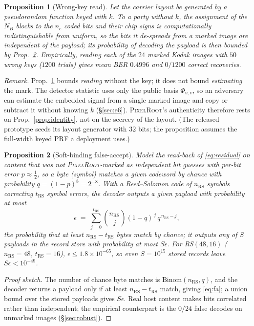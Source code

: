 \documentclass[journal]{IEEEtran}
\newcommand{\pr}{\textup{\textsc{PixelRoot}}}
\newtheorem{proposition}{Proposition}
\begin{document}
\begin{proposition}[Wrong-key read]\label{prop:carriers}
Let the carrier layout be generated by a pseudorandom function keyed with $k$.
To a party without $k$, the assignment of the $N_B$ blocks to the $n_c$ coded
bits and their chip signs is computationally indistinguishable from uniform, so
the bits it de-spreads from a marked image are independent of the payload; its
probability of decoding the payload is then bounded by Prop.~\ref{prop:v2}.
Empirically, reading each of the $24$ marked Kodak images with $50$ wrong keys
($1200$ trials) gives mean BER $0.4996$ and $0/1200$ correct recoveries.
\end{proposition}

\noindent\emph{Remark.} Prop.~\ref{prop:carriers} bounds \emph{reading} without
the key; it does not bound \emph{estimating} the mark. The detector statistic
uses only the public basis $\Phi_{u,v}$, so an adversary can estimate the
embedded signal from a single marked image and copy or subtract it without
knowing $k$ (\S\ref{sec:e6}). \pr{}'s authenticity therefore rests on
Prop.~\ref{prop:identity}, not on the secrecy of the layout. (The released
prototype seeds its layout generator with $32$ bits; the proposition assumes the
full-width keyed PRF a deployment uses.)

\begin{proposition}[Soft-binding false-accept]\label{prop:v2}
Model the read-back of \eqref{eq:residual} on content that was \emph{not}
\pr{}-marked as independent bit guesses with per-bit error $p\!\approx\!\tfrac12$,
so a byte (symbol) matches a given codeword by chance with probability
$q=(1-p)^{8}=2^{-8}$. With a Reed--Solomon code of $n_{\mathrm{RS}}$ symbols
correcting $t_{\mathrm{RS}}$ symbol errors, the decoder outputs a given payload
with probability at most
\begin{equation}
\epsilon \;=\; \sum_{j=0}^{t_{\mathrm{RS}}}\binom{n_{\mathrm{RS}}}{j}(1-q)^{\,j}\,q^{\,n_{\mathrm{RS}}-j},
\label{eq:fa}
\end{equation}
the probability that at least $n_{\mathrm{RS}}-t_{\mathrm{RS}}$ bytes match by
chance; it outputs \emph{any} of $S$ payloads in the record store with probability
at most $S\epsilon$. For \mbox{RS$(48,16)$} ($n_{\mathrm{RS}}=48$, $t_{\mathrm{RS}}=16$),
$\epsilon\le 1.8\times10^{-65}$, so even $S=10^{15}$ stored records leave
$S\epsilon<10^{-49}$.
\end{proposition}
\begin{proof}[Proof sketch]
The number of chance byte matches is $\mathrm{Binom}(n_{\mathrm{RS}},q)$, and the
decoder returns a payload only if at least $n_{\mathrm{RS}}-t_{\mathrm{RS}}$ match,
giving \eqref{eq:fa}; a union bound over the stored payloads gives $S\epsilon$.
Real host content makes bits correlated rather than independent; the empirical
counterpart is the $0/24$ false decodes on unmarked images (\S\ref{sec:robust}).
\end{proof}
\end{document}
